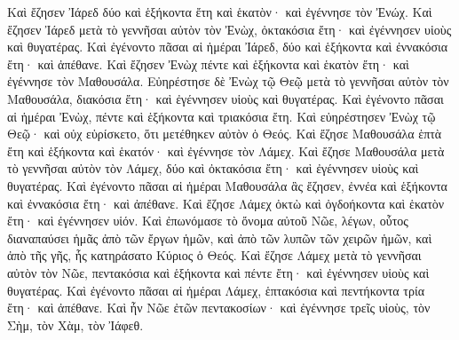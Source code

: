 {Καὶ ἔζησεν Ἰάρεδ δύο καὶ ἑξήκοντα ἔτη καὶ ἑκατὸν· καὶ ἐγέννησε τὸν Ἐνώχ.
Καὶ ἔζησεν Ἰάρεδ μετὰ τὸ γεννῆσαι αὐτὸν τὸν Ἐνὼχ, ὀκτακόσια ἔτη· καὶ ἐγέννησεν υἱοὺς καὶ θυγατέρας.
Καὶ ἐγένοντο πᾶσαι αἱ ἡμέραι Ἰάρεδ, δύο καὶ ἑξήκοντα καὶ ἐννακόσια ἔτη· καὶ ἀπέθανε.
Καὶ ἔζησεν Ἐνὼχ πέντε καὶ ἑξήκοντα καὶ ἑκατὸν ἔτη· καὶ ἐγέννησε τὸν Μαθουσάλα.
Εὐηρέστησε δὲ Ἐνὼχ τῷ Θεῷ μετὰ τὸ γεννῆσαι αὐτὸν τὸν Μαθουσάλα, διακόσια ἔτη· καὶ ἐγέννησεν υἱοὺς καὶ θυγατέρας.
Καὶ ἐγένοντο πᾶσαι αἱ ἡμέραι Ἐνὼχ, πέντε καὶ ἑξήκοντα καὶ τριακόσια ἔτη.
Καὶ εὐηρέστησεν Ἐνὼχ τῷ Θεῷ· καὶ οὐχ εὑρίσκετο, ὅτι μετέθηκεν αὐτὸν ὁ Θεός.
Καὶ ἔζησε Μαθουσάλα ἑπτὰ ἔτη καὶ ἑξήκοντα καὶ ἑκατόν· καὶ ἐγέννησε τὸν Λάμεχ.
Καὶ ἔζησε Μαθουσάλα μετὰ τὸ γεννῆσαι αὐτὸν τὸν Λάμεχ, δύο καὶ ὀκτακόσια ἔτη· καὶ ἐγέννησεν υἱοὺς καὶ θυγατέρας.
Καὶ ἐγένοντο πᾶσαι αἱ ἡμέραι Μαθουσάλα ἃς ἔζησεν, ἐννέα καὶ ἑξήκοντα καὶ ἐννακόσια ἔτη· καὶ ἀπέθανε.
Καὶ ἔζησε Λάμεχ ὀκτὼ καὶ ὀγδοήκοντα καὶ ἑκατὸν ἔτη· καὶ ἐγέννησεν υἱόν.
Καὶ ἐπωνόμασε τὸ ὄνομα αὐτοῦ Νῶε, λέγων, οὗτος διαναπαύσει ἡμᾶς ἀπὸ τῶν ἔργων ἡμῶν, καὶ ἀπὸ τῶν λυπῶν τῶν χειρῶν ἡμῶν, καὶ ἀπὸ τῆς γῆς, ἧς κατηράσατο Κύριος ὁ Θεός.
Καὶ ἔζησε Λάμεχ μετὰ τὸ γεννῆσαι αὐτὸν τὸν Νῶε, πεντακόσια καὶ ἑξήκοντα καὶ πέντε ἔτη· καὶ ἐγέννησεν υἱοὺς καὶ θυγατέρας.
Καὶ ἐγένοντο πᾶσαι αἱ ἡμέραι Λάμεχ, ἑπτακόσια καὶ πεντήκοντα τρία ἔτη· καὶ ἀπέθανε.
Καὶ ἦν Νῶε ἐτῶν πεντακοσίων· καὶ ἐγέννησε τρεῖς υἱοὺς, τὸν Σὴμ, τὸν Χὰμ, τὸν Ἰάφεθ.

}
